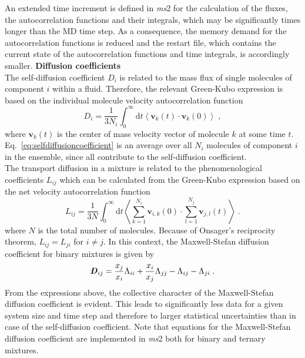 An extended time increment is defined in \textit{ms}2 for the calculation of the fluxes, the autocorrelation functions and their integrals, which may be significantly times longer than the MD time step. As a consequence, the memory demand for the autocorrelation functions is reduced and the restart file, which contains the current state of the autocorrelation functions and time integrals, is accordingly smaller.
\newline \newline
\textbf{Diffusion coefficients}\\
The self-diffusion coefficient $D_{i}$ is related to the mass flux of single molecules of component $i$ within a fluid. Therefore, the relevant Green-Kubo expression is based on the individual molecule velocity autocorrelation function \parencite{Gubbins1972}
\begin{equation}
D_{i}=\frac{1}{3N_{i}}\int^{\infty}_{0} \mathrm dt \left\langle \textbf{v}_{k}\left(t\right) \cdot \textbf{v}_{k}\left(0\right)\right\rangle \;,
\label{eq:selfdiffusioncoefficient}
\end{equation}
where $\textbf{v}_{k}\left(t\right)$ is the center of mass velocity vector of molecule $k$ at some time $t$. Eq.~\eqref{eq:selfdiffusioncoefficient} is an average over all $N_{i}$ molecules of component $i$ in the ensemble, since all contribute to the self-diffusion coefficient.\\
The transport diffusion in a mixture is related to the phenomenological coefficients $L_{ij}$ which can be calculated from the Green-Kubo expression based on the net velocity autocorrelation function
\begin{equation}
L_{ij}=\frac{1}{3N} \int^{\infty}_{0} \mathrm dt \left\langle \sum^{N_{i}}_{k=1} \textbf{v}_{i,k}\left(0\right) \cdot \sum^{N_{j}}_{l=1} \textbf{v}_{j,l} \left(t\right)\right\rangle \;.
\label{eq:difcoef}
\end{equation}
where $N$ is the total number of molecules. Because of Onsager's reciprocity theorem, $L_{ij}=L_{ji}$ for $i\neq j$. In this context, the Maxwell-Stefan diffusion coefficient for binary mixtures is given by \parencite{Krishna2005}
\begin{equation}
\dcoeff_{ij}=\frac{x_{j}}{x_{i}}\Lambda_{ii}+\frac{x_{i}}{x_{j}}\Lambda_{jj}-\Lambda_{ij}-\Lambda_{ji} \; .
\label{eq:diffusioncoefficient}
\end{equation}
From the expressions above, the collective character of the Maxwell-Stefan diffusion coefficient is evident. This leads to significantly less data for a given system size and time step and therefore to larger statistical uncertainties than in case of the self-diffusion coefficient. Note that equations for the Maxwell-Stefan diffusion coefficient are implemented in \textit{ms}2 both for binary and ternary mixtures. %
